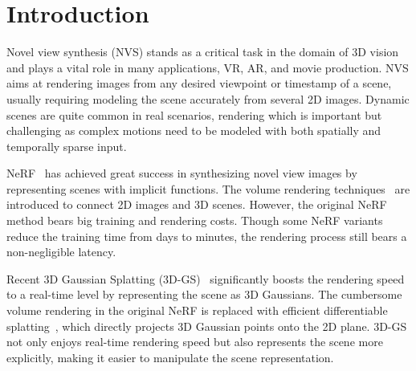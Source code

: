 

\section{Introduction}
\label{sec:intro}
Novel view synthesis (NVS) stands as a critical task in the domain of 3D vision and plays a vital role in many applications, \eg VR, AR, and movie production. NVS aims at rendering images from any desired viewpoint or timestamp of a scene, usually requiring modeling the scene accurately from several 2D images. Dynamic scenes are quite common in real scenarios, rendering which is important but challenging as complex motions need to be modeled with both spatially and temporally sparse input.

NeRF~\cite{mildenhall2021nerf} has achieved great success in synthesizing novel view images by representing scenes with implicit functions. The volume rendering techniques~\cite{drebin1988volume} are introduced to connect 2D images and 3D scenes. However, the original NeRF method bears big training and rendering costs. Though some NeRF variants~\cite{dvgo,tineuvox,hexplane,kplanes,tensor4d,fridovich2022plenoxels,instantngp} reduce the training time from days to minutes, the rendering process still bears a non-negligible latency.

Recent 3D Gaussian Splatting (3D-GS)~\cite{3dgs} significantly boosts the rendering speed to a real-time level by representing the scene as 3D Gaussians. The cumbersome volume rendering in the original NeRF is replaced with efficient differentiable splatting~\cite{yifan2019differentiablesplatting}, which directly projects 3D Gaussian points onto the 2D plane. 3D-GS not only enjoys real-time rendering speed but also represents the scene more explicitly, making it easier to manipulate the scene representation. 

